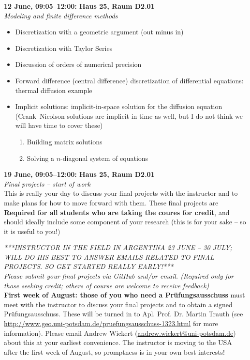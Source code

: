 \documentclass[10pt,a4paper]{amsart}
\begin{document}
\begin{minipage}{\linewidth}
\noindent \textbf{12 June, 09:05--12:00: Haus 25, Raum D2.01}\\
\textit{Modeling and finite difference methods}
\begin{itemize}
 \item Discretization with a geometric argument (out minus in)
 \item Discretization with Taylor Series
 \item Discussion of orders of numerical precision
 \item Forward difference (central difference) discretization of differential equations: thermal diffusion example
 \item Implicit solutions: implicit-in-space solution for the diffusion equation (Crank--Nicolson solutions are implicit in time as well, but I do not think we will have time to cover these)
 \begin{enumerate}
  \item Building matrix solutions
  \item Solving a $n$-diagonal system of equations
 \end{enumerate}
\end{itemize}
\vspace{12pt}
\end{minipage}

\begin{minipage}{\linewidth}
\noindent \textbf{19 June, 09:05--12:00: Haus 25, Raum D2.01}\\
\textit{Final projects -- start of work}\\
This is really your day to discuss your final projects with the instructor and to make plans for how to move forward with them. These final projects are \textbf{Required for all students who are taking the coures for credit}, and should ideally include some component of your research (this is for your sake -- so it is useful to you!)
\vspace{12pt}
\end{minipage}

\noindent\emph{***INSTRUCTOR IN THE FIELD IN ARGENTINA 23 JUNE -- 30 JULY; WILL DO HIS BEST TO ANSWER EMAILS RELATED TO FINAL PROJECTS. SO GET STARTED REALLY EARLY!***}\\

\noindent\emph{Please submit your final projects via GitHub and/or email. (Required only for those seeking credit; others of course are welcome to receive feedback)}\\

\noindent\textbf{First week of August: those of you who need a Prüfungsausschuss} must meet with the instructor to discuss your final projects and to obtain a signed Prüfungsausschuss. These will be turned in to Apl. Prof. Dr. Martin Trauth (see \url{http://www.geo.uni-potsdam.de/pruefungsausschuss-1323.html} for more information). Please email Andrew Wickert (\url{andrew.wickert@uni-potsdam.de}) about this at your earliest convenience. The instructor is moving to the USA after the first week of August, so promptness is in your own best interests!
\end{document}
